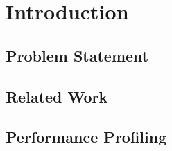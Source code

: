 \chapter{Introduction}\label{ch:introduction}

\section{Problem Statement}\label{sec:problem-statement}


\section{Related Work}\label{sec:related-work}


\section{Performance Profiling}\label{sec:performance-profiling}


